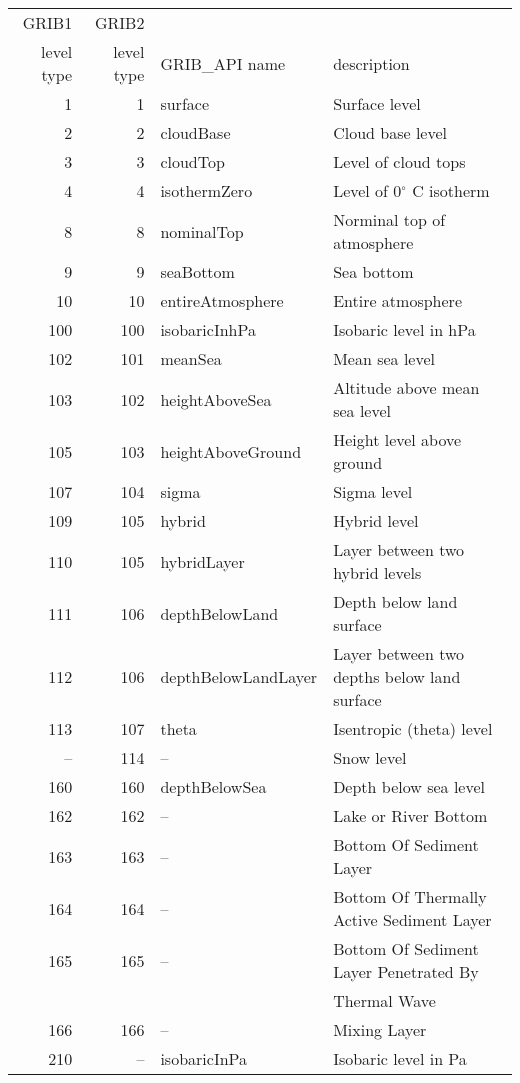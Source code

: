 \begin{tabular}{|r|r|l|l|}
\hline
\rowcolor[gray]{.9}
GRIB1  & GRIB2 & & \\
\rowcolor[gray]{.9}
 level type &  level type & GRIB\_API name & description \\
     1  &    1 & surface                        & Surface level \\
     2  &    2 & cloudBase                    & Cloud base level \\
     3  &    3 & cloudTop                     & Level of cloud tops \\
     4  &    4 & isothermZero               & Level of 0$^{\circ}$ C isotherm \\
     8  &    8 & nominalTop                 & Norminal top of atmosphere \\
     9  &    9 & seaBottom                   & Sea bottom \\
   10  &  10 & entireAtmosphere        & Entire atmosphere \\
 100  & 100 & isobaricInhPa              & Isobaric level in hPa \\
 102  & 101 & meanSea                     & Mean sea level \\
 103  & 102 & heightAboveSea          & Altitude above mean sea level \\
 105  & 103 & heightAboveGround    & Height level above ground \\
 107  & 104 & sigma                          & Sigma level \\
 109  & 105 & hybrid                         & Hybrid level      \\
 110  & 105 & hybridLayer                 & Layer between two hybrid levels   \\
 111  & 106 & depthBelowLand          & Depth below land surface    \\
 112  & 106 & depthBelowLandLayer & Layer between two depths below land surface   \\   
 113  & 107 & theta                           & Isentropic (theta) level \\
   --  & 114 & --                               & Snow level \\
 160  & 160 & depthBelowSea            & Depth below sea level    \\
 162  & 162 & --                               & Lake or River Bottom \\
 163  & 163 & --                               & Bottom Of Sediment Layer  \\
 164  & 164 & --                               & Bottom Of Thermally Active Sediment Layer  \\
 165  & 165 & --                               & Bottom Of Sediment Layer Penetrated By \\ 
         &        &                                    & Thermal Wave  \\
 166  & 166 & --                               & Mixing Layer  \\
 210  & --   & isobaricInPa                & Isobaric level in Pa \\
\hline
\end{tabular}

